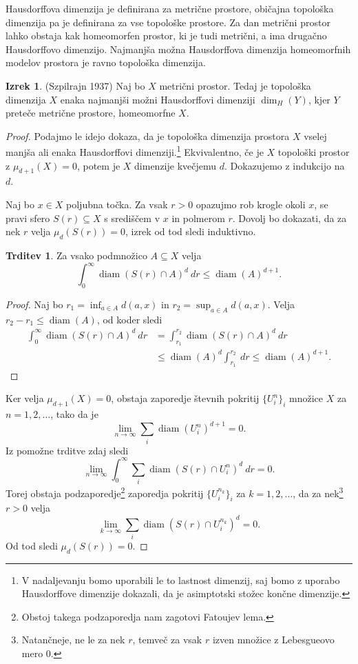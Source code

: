 \documentclass[11pt]{book}
\DeclareMathOperator\diam{diam}
\def\literatura{\color{modra}}
\theoremstyle{definition}
\theoremstyle{zgled}
\theoremstyle{odprtproblem}
\theoremstyle{domacanaloga}
\newenvironment{dokaz}
    {\color{siva}\begin{proof}}
    {\end{proof}}
\theoremstyle{izrek}
\newtheorem*{izrek}{Izrek}
\newtheorem*{trditev}{Trditev}
\begin{document}
Hausdorffova dimenzija je definirana za metrične prostore, običajna topološka dimenzija pa je definirana za vse topološke prostore. Za dan metrični prostor lahko obstaja kak homeomorfen prostor, ki je tudi metrični, a ima drugačno Hausdorffovo dimenzijo. Najmanjša možna Hausdorffova dimenzija homeomorfnih modelov prostora je ravno topološka dimenzija.

\begin{izrek}{\literatura (Szpilrajn 1937)}
Naj bo $X$ metrični prostor. Tedaj je topološka dimenzija $X$ enaka najmanjši možni Hausdorffovi dimenziji $\dim_H(Y)$, kjer $Y$ preteče metrične prostore, homeomorfne $X$.
\end{izrek}

\begin{dokaz}
Podajmo le idejo dokaza, da je topološka dimenzija prostora $X$ vselej manjša ali enaka Hausdorffovi dimenziji.\footnote{V nadaljevanju bomo uporabili le to lastnost dimenzij, saj bomo z uporabo Hausdorffove dimenzije dokazali, da je asimptotski stožec končne dimenzije.} Ekvivalentno, če je $X$ topološki prostor z $\mu_{d+1}(X) = 0$, potem je $X$ dimenzije kvečjemu $d$. Dokazujemo z indukcijo na $d$.

Naj bo $x \in X$ poljubna točka. Za vsak $r > 0$ opazujmo rob krogle okoli $x$, se pravi sfero $S(r) \subseteq X$ s središčem v $x$ in polmerom $r$. Dovolj bo dokazati, da za nek $r$ velja $\mu_d(S(r)) = 0$, izrek od tod sledi induktivno.

\begin{trditev}
Za vsako podmnožico $A \subseteq X$ velja
\[
\int_0^\infty \diam(S(r) \cap A)^d \ dr \leq \diam(A)^{d+1}.
\]
\end{trditev}

\begin{dokaz}
Naj bo $r_1 = \inf_{a \in A} d(a, x)$ in $r_2 = \sup_{a \in A} d(a, x)$. Velja $r_2 - r_1 \leq \diam(A)$, od koder sledi
\begin{align*}
\int_0^\infty \diam(S(r) \cap A)^d \ dr &= \int_{r_1}^{r_2} \diam(S(r) \cap A)^d \ dr \\
&\leq \diam(A)^d \int_{r_1}^{r_2} \ dr \leq \diam(A)^{d+1}.
\end{align*}
\end{dokaz}


Ker velja $\mu_{d+1}(X) = 0$, obstaja zaporedje števnih pokritij $\{ U_i^n \}_i$ množice $X$ za $n = 1, 2, \dots$, tako da je 
\[
\lim_{n \to \infty} \sum_i \diam(U_i^n)^{d+1} = 0.
\]
Iz pomožne trditve zdaj sledi
\[
\lim_{n \to \infty} \int_{0}^\infty \sum_i \diam(S(r) \cap U_i^n)^d \ dr = 0.
\]
Torej obstaja podzaporedje\footnote{Obstoj takega podzaporedja nam zagotovi Fatoujev lema.} zaporedja pokritij $\{ U_i^{n_k} \}_i$ za $k = 1, 2, \dots$, da za nek\footnote{Natančneje, ne le za nek $r$, temveč za vsak $r$ izven množice z Lebesgueovo mero $0$.} $r > 0$ velja
\[
\lim_{k \to \infty} \sum_i \diam(S(r) \cap U_i^{n_k})^d = 0.
\]
Od tod sledi $\mu_d(S(r)) = 0$.
\end{dokaz}
\end{document}
